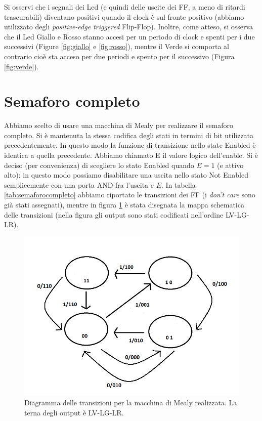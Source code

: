 \documentclass[10pt,a4paper]{article}
\begin{document}
Si osservi che i segnali dei Led (e quindi delle uscite dei FF, a meno di ritardi trascurabili) diventano positivi quando il clock è sul fronte positivo (abbiamo utilizzato degli \emph{positive-edge triggered} Flip-Flop). Inoltre, come atteso, si osserva che il Led Giallo e Rosso stanno accesi per un periodo di clock e spenti per i due successivi (Figure \ref{fig:giallo} e \ref{fig:rosso}), mentre il Verde si comporta al contrario cioè sta acceso per due periodi e spento per il successivo (Figura \ref{fig:verde}).

\section{Semaforo completo}
Abbiamo scelto di usare una macchina di Mealy per realizzare il semaforo completo. Si è mantenuta la stessa codifica degli stati in termini di bit utilizzata precedentemente. In questo modo la funzione di transizione nello state Enabled è identica a quella precedente. Abbiamo chiamato E il valore logico dell'enable.
Si è deciso (per convenienza) di scegliere lo stato Enabled quando $E = 1$ (e attivo alto): in questo modo possiamo disabilitare una uscita nello stato Not Enabled semplicemente con una porta AND fra l'uscita e $E$. In tabella \ref{tab:semaforocompleto} abbiamo riportato le transizioni dei FF (i \emph{don't care} sono già stati assegnati), mentre in figura \ref{fig:FSMcomplete} è stata disegnata la mappa schematica delle transizioni (nella figura gli output sono stati codificati nell'ordine LV-LG-LR).

\begin{figure}[!htb]
\centering
\includegraphics[scale=0.7]{FSMcomplete.png}
\caption{Diagramma delle transizioni per la macchina di Mealy realizzata. La terna degli output è LV-LG-LR.\label{fig:FSMcomplete}}
\end{figure}
\end{document}
